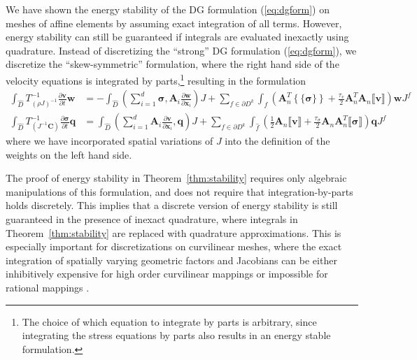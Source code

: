 \documentclass{siamart0216}
\newcommand{\pd}[2]{\frac{\partial#1}{\partial#2}}
\newcommand{\LRp}[1]{\left( #1 \right)}
\newcommand{\LRa}[1]{\left\langle #1 \right\rangle}
\newcommand{\LRc}[1]{\left\{ #1 \right\}}
\newcommand{\jump}[1] {\ensuremath{\llbracket#1\rrbracket}}
\newcommand{\avg}[1] {\ensuremath{\LRc{\!\{#1\}\!}}}
\newcommand{\Lk}{L^2\LRp{D^k}}
\newcommand{\Ldk}{L^2\LRp{\partial D^k}}
\newcommand{\Dhat}{\widehat{D}}
\begin{document}
We have shown the energy stability of the DG formulation (\ref{eq:dgform}) on meshes of affine elements by assuming exact integration of all terms.  However, energy stability can still be guaranteed if integrals are evaluated inexactly using quadrature.  Instead of discretizing the ``strong'' DG formulation (\ref{eq:dgform}), we discretize the ``skew-symmetric'' formulation, where the right hand side of the velocity equations is integrated by parts,\footnote{The choice of which equation to integrate by parts is arbitrary, since integrating the stress equations by parts also results in an energy stable formulation. } resulting in the formulation 
\begin{align*}
\int_{\Dhat} T^{-1}_{(\rho J)^{-1}} \pd{\bm{v}}{t}\bm{w} &= -\int_{\Dhat}\LRp{\sum_{i=1}^d \bm{\sigma},\bm{A}_i \pd{\bm{w}}{\bm{x}_i}}J  + \sum_{f \in \partial D^k} \int_{\widehat{f}}\LRp{\bm{A}_n^T\avg{\bm{\sigma}} + \frac{\tau_v}{2}\bm{A}_n^T\bm{A}_n\jump{\bm{v}}}\bm{w}J^f \nonumber\\
\int_{\Dhat}  T^{-1}_{\LRp{J^{-1}\bm{C}}} \pd{\bm{\sigma}}{t}\bm{q} &= \int_{\Dhat} \LRp{\sum_{i=1}^d \bm{A}_i \pd{\bm{v}}{\bm{x}_i},\bm{q}}J + \sum_{f\in \partial D^k}\int_{\widehat{f}}\LRp{\frac{1}{2}\bm{A}_n\jump{\bm{v}} + \frac{\tau_{\sigma}}{2}\bm{A}_n\bm{A}_n^T\jump{\bm{\sigma}}}\bm{q}J^f
\end{align*}
where we have incorporated spatial variations of $J$ into the definition of the weights on the left hand side.  

The proof of energy stability in Theorem~\ref{thm:stability} requires only algebraic manipulations of this formulation, and does not require that integration-by-parts holds discretely.  This implies that a discrete version of energy stability is still guaranteed in the presence of inexact quadrature, where integrals in Theorem~\ref{thm:stability} are replaced with quadrature approximations.  This is especially important for discretizations on curvilinear meshes, where the exact integration of spatially varying geometric factors and Jacobians can be either inhibitively expensive for high order curvilinear mappings or impossible for rational mappings \cite{engvall2016isogeometric, michoski2015foundations}.  
\end{document}
